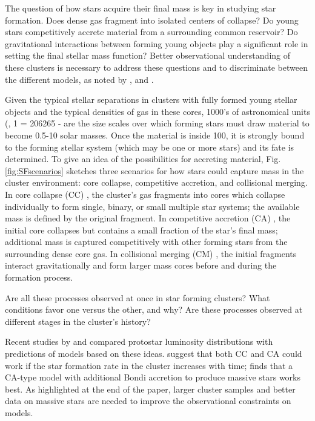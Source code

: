 The question of how stars acquire their final mass is key in studying star formation. Does dense gas fragment into isolated centers of collapse? Do young stars competitively accrete material from a surrounding common reservoir? Do gravitational interactions between forming young objects play a significant role in setting the final stellar mass function? Better observational understanding of these clusters is necessary to address these questions and to discriminate between the different models, as noted by \cite{Bonnell:2006ee}, \cite{Offner:2011ex} and \cite{Myers:2011fy}.

Given the typical stellar separations in clusters with fully formed young stellar objects and the typical densities of gas in these cores, \num{1000}'s of astronomical units (\si{\au}, \SI{1}{\parsec} = \SI{206265}{\au} - are the size scales over which forming stars must draw material to become 0.5-10 solar masses. Once the material is inside \SI{100}{\au}, it is strongly bound to the forming stellar system (which may be one or more stars) and its fate is determined. To give an idea of the possibilities for accreting material, Fig. \ref{fig:SFscenarios} sketches three scenarios for how stars could capture mass in the cluster environment: core collapse, competitive accretion, and collisional merging. In core collapse (CC) \citep[Fig.~\ref{scenarios:a},][]{McKee:2003gxa, Myers:2011fy}, the cluster's gas fragments into cores which collapse individually to form single, binary, or small multiple star systems; the available mass is defined by the original fragment. In competitive accretion (CA) \citep[Fig.~\ref{scenarios:b},][]{Bonnell:1997vta}, the initial core collapses but contains a small fraction of the star's final mass; additional mass is captured competitively with other forming stars from the surrounding dense core gas. In collisional merging (CM) \citep[Fig.~\ref{scenarios:c},][]{Bonnell:2002et}, the initial fragments interact gravitationally and form larger mass cores before and during the formation process. 

Are all these processes observed at once in star forming clusters? What conditions favor one versus the other, and why? Are these processes observed at different stages in the cluster's history?

Recent studies by \cite{Offner:2011ex} and \cite{Myers:2011p1338} compared protostar luminosity distributions with predictions of models based on these ideas. \cite{Offner:2011ex} suggest that both CC and CA could work if the star formation rate in the cluster increases with time; \citep{Myers:2011fy} finds that a CA-type model with additional Bondi accretion to produce massive stars works best. As highlighted at the end of the \cite{Offner:2011ex} paper, larger cluster samples and better data on massive stars are needed to improve the observational constraints on models.


